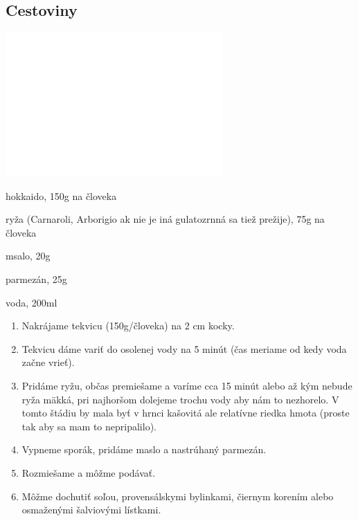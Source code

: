 \setcounter{step}{0}
\subsection{Cestoviny}

\begin{ingredient}
\includegraphics[height=5.5cm]{images/florentin}
\def\portions{1}%

\begin{main}
	\item hokkaido, 150g na človeka
  \item ryža (Carnaroli, Arborigio ak nie je iná gulatozrnná sa tiež prežije), 75g na človeka
  \item msalo, 20g
  \item parmezán, 25g
  \item voda, 200ml
\end{main}
\end{ingredient}
\begin{recipe}

\begin{enumerate}

\item{Nakrájame tekvicu (150g/človeka) na 2 cm kocky.}
\item{Tekvicu dáme variť do osolenej vody na 5 minút (čas meriame od kedy voda začne vrieť).}
\item{Pridáme ryžu, občas premiešame a varíme cca 15 minút alebo až kým nebude ryža mäkká, 
pri najhoršom dolejeme trochu vody aby nám to nezhorelo. 
V tomto štádiu by mala byť v hrnci kašovitá ale relatívne riedka 
hmota (proste tak aby sa mam to nepripalilo).}
\item{Vypneme sporák, pridáme maslo a nastrúhaný parmezán.}
\item{Rozmiešame a môžme podávať.}
\item{Môžme dochutiť soľou, provensálskymi bylinkami, čiernym korením alebo osmaženými šalviovými lístkami.}


\end{enumerate}
\end{recipe}

\begin{notes}

\end{notes}
\clearpage	
